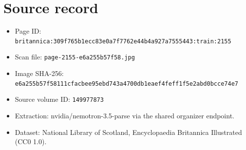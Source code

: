 \documentclass{article}
\begin{document}
\section*{Source record}
\begin{itemize}
\item Page ID: \texttt{britannica:309f765b1ecc83e0a7f7762e44b4a927a7555443:train:2155}
\item Scan file: \texttt{page-2155-e6a255b57f58.jpg}
\item Image SHA-256: \texttt{e6a255b57f58111cfacbee95ebd743a4700db1eaef4feff1f5e2abd0bcce74e7}
\item Source volume ID: \texttt{149977873}
\item Extraction: nvidia/nemotron-3.5-parse via the shared organizer endpoint.
\item Dataset: National Library of Scotland, Encyclopaedia Britannica Illustrated (CC0 1.0).
\end{itemize}
\end{document}
